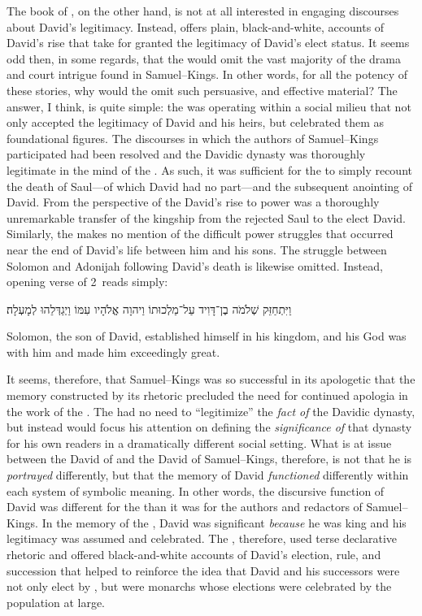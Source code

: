The book of \chronicles, on the other hand, is not at all interested in engaging discourses about David's legitimacy. Instead, \chronicles offers plain, black-and-white, accounts of David's rise that take for granted the legitimacy of David's elect status. It seems odd then, in some regards, that the \chronicler would omit the vast majority of the drama and court intrigue found in Samuel--Kings. In other words, for all the potency of these stories, why would the \chronicler omit such persuasive, and effective material? The answer, I think, is quite simple: the \chronicler was operating within a social milieu that not only accepted the legitimacy of David and his heirs, but celebrated them as foundational figures. The discourses in which the authors of Samuel--Kings participated had been resolved and the Davidic dynasty was thoroughly legitimate in the mind of the \chronicler. As such, it was sufficient for the \chronicler to simply recount the death of Saul---of which David had no part---and the subsequent anointing of David. From the perspective of the \chronicler David's rise to power was a thoroughly unremarkable transfer of the kingship from the rejected Saul to the elect David. Similarly, the \chronicler makes no mention of the difficult power struggles that occurred near the end of David's life between him and his sons. The struggle between Solomon and Adonijah following David's death is likewise omitted. Instead, opening verse of 2~\chronicles reads simply:
    \begin{hebrewtext}
        וַיִּתְחַזֵּק שְׁלֹמֹה בֶן־דָּוִיד עַל־מַלְכוּתוֹ וַיהוָה אֱלֹהָיו עִמּוֹ וַיְגַדְּלֵהוּ לְמָעְלָה׃
    \end{hebrewtext}
    \begin{translation}
        Solomon, the son of David, established himself in his kingdom, and \yahweh his God was with him and made him exceedingly great.   
    \end{translation}
\noindent
It seems, therefore, that Samuel--Kings was so successful in its apologetic that the memory constructed by its rhetoric precluded the need for continued apologia in the work of the \chronicler. The \chronicler had no need to ``legitimize'' the \emph{fact of} the Davidic dynasty, but instead would focus his attention on defining the \emph{significance of} that dynasty for his own readers in a dramatically different social setting. What is at issue between the David of \chronicles and the David of Samuel--Kings, therefore, is not that he is \emph{portrayed} differently, but that the memory of David \emph{functioned} differently within each system of symbolic meaning. In other words, the discursive function of David was different for the \chronicler than it was for the authors and redactors of Samuel--Kings. In the memory of the \chronicler, David was significant \emph{because} he was king and his legitimacy was assumed and celebrated. The \chronicler, therefore, used terse declarative rhetoric and offered black-and-white accounts of David's election, rule, and succession that helped to reinforce the idea that David and his successors were not only elect by \yahweh, but were monarchs whose elections were celebrated by the population at large.


